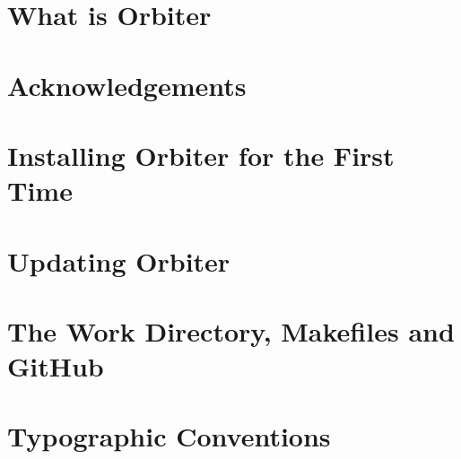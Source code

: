 \section{What is Orbiter}




\label{sec:what:is:orbiter}

\bigskip

\clearpage


\section{Acknowledgements}
\label{sec:acknowledgements}






\bigskip

\clearpage


\section{Installing Orbiter for the First Time}
\label{sec:install:first}






\bigskip

\clearpage

\section{Updating Orbiter}
\label{sec:updating:orbiter}





\bigskip

\clearpage

\section{The Work Directory, Makefiles and GitHub}
\label{sec:work:directory}





\bigskip

\clearpage

\section{Typographic Conventions}
\label{sec:typographic:conventions}





\bigskip

\clearpage


